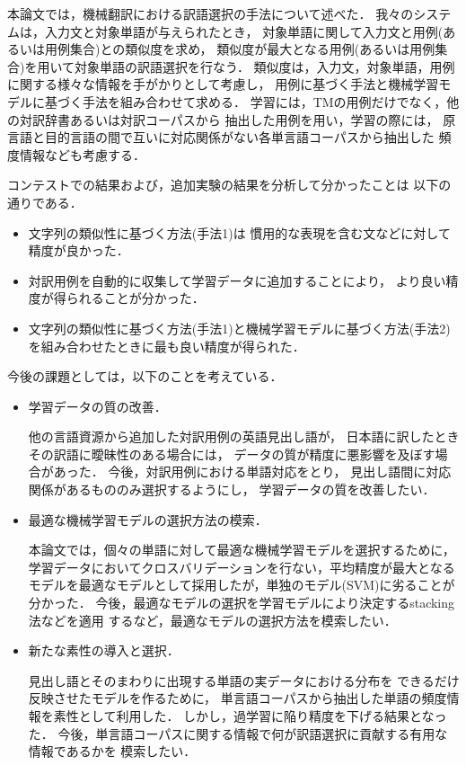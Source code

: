 本論文では，機械翻訳における訳語選択の手法について述べた．
我々のシステムは，入力文と対象単語が与えられたとき，
対象単語に関して入力文と用例(あるいは用例集合)との類似度を求め，
類似度が最大となる用例(あるいは用例集合)を用いて対象単語の訳語選択を行なう．
類似度は，入力文，対象単語，用例に関する様々な情報を手がかりとして考慮し，
用例に基づく手法と機械学習モデルに基づく手法を組み合わせて求める．
学習には，TMの用例だけでなく，他の対訳辞書あるいは対訳コーパスから
抽出した用例を用い，学習の際には，
原言語と目的言語の間で互いに対応関係がない各単言語コーパスから抽出した
頻度情報なども考慮する．

コンテストでの結果および，追加実験の結果を分析して分かったことは
以下の通りである．

\begin{itemize}
\item 文字列の類似性に基づく方法(手法1)は
  慣用的な表現を含む文などに対して精度が良かった．
\item 対訳用例を自動的に収集して学習データに追加することにより，
  より良い精度が得られることが分かった．
\item 文字列の類似性に基づく方法(手法1)と機械学習モデルに基づく方法(手法2)
  を組み合わせたときに最も良い精度が得られた．
\end{itemize}

今後の課題としては，以下のことを考えている．
\begin{itemize}
\item 学習データの質の改善．

  他の言語資源から追加した対訳用例の英語見出し語が，
  日本語に訳したときその訳語に曖昧性のある場合には，
  データの質が精度に悪影響を及ぼす場合があった．
  今後，対訳用例における単語対応をとり，
  見出し語間に対応関係があるもののみ選択するようにし，
  学習データの質を改善したい．
  
\item 最適な機械学習モデルの選択方法の模索．

  本論文では，個々の単語に対して最適な機械学習モデルを選択するために，
  学習データにおいてクロスバリデーションを行ない，平均精度が最大となる
  モデルを最適なモデルとして採用したが，単独のモデル(SVM)に劣ることが分かった．
  今後，最適なモデルの選択を学習モデルにより決定するstacking法などを適用
  するなど，最適なモデルの選択方法を模索したい．

\item 新たな素性の導入と選択．

  見出し語とそのまわりに出現する単語の実データにおける分布を
  できるだけ反映させたモデルを作るために，
  単言語コーパスから抽出した単語の頻度情報を素性として利用した．
  しかし，過学習に陥り精度を下げる結果となった．
  今後，単言語コーパスに関する情報で何が訳語選択に貢献する有用な情報であるかを
  模索したい．
\end{itemize}

